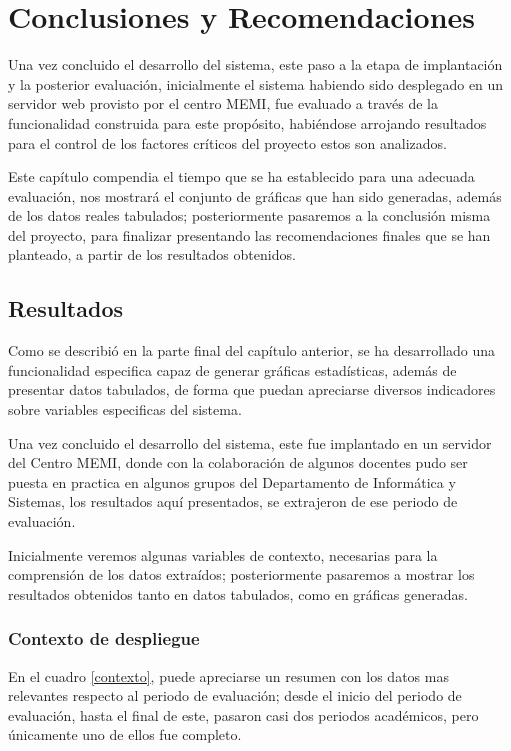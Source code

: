 \chapter{Conclusiones y Recomendaciones}

Una vez concluido el desarrollo del sistema, este paso a la etapa de
implantación y la posterior evaluación, inicialmente el sistema habiendo sido
desplegado en un servidor web provisto por el centro MEMI, fue evaluado a través
de la funcionalidad construida para este propósito, habiéndose arrojando
resultados para el control de los factores críticos del proyecto estos son
analizados.

Este capítulo compendia el tiempo que se ha establecido para una adecuada
evaluación, nos mostrará el conjunto de gráficas que han sido generadas, además
de los datos reales tabulados; posteriormente pasaremos a la conclusión misma
del proyecto, para finalizar presentando las recomendaciones finales que se han
planteado, a partir de los resultados obtenidos.

\section{Resultados}
Como se describió en la parte final del capítulo anterior, se ha desarrollado
una funcionalidad especifica capaz de generar gráficas estadísticas, además de
presentar datos tabulados, de forma que puedan apreciarse diversos indicadores
sobre variables especificas del sistema.

Una vez concluido el desarrollo del sistema, este fue implantado en un servidor
del Centro MEMI, donde con la colaboración de algunos docentes pudo ser puesta
en practica en algunos grupos del Departamento de Informática y Sistemas, los
resultados aquí presentados, se extrajeron de ese periodo  de evaluación.

Inicialmente veremos algunas variables de contexto, necesarias para la
comprensión de los datos extraídos; posteriormente pasaremos a mostrar los
resultados obtenidos tanto en datos tabulados, como en gráficas generadas.

\subsection{Contexto de despliegue}
En el cuadro \ref{contexto}, puede apreciarse un resumen con los datos mas
relevantes respecto al periodo de evaluación; desde el inicio del periodo de
evaluación, hasta el final de este, pasaron casi dos periodos académicos, pero
únicamente uno de ellos fue completo.

